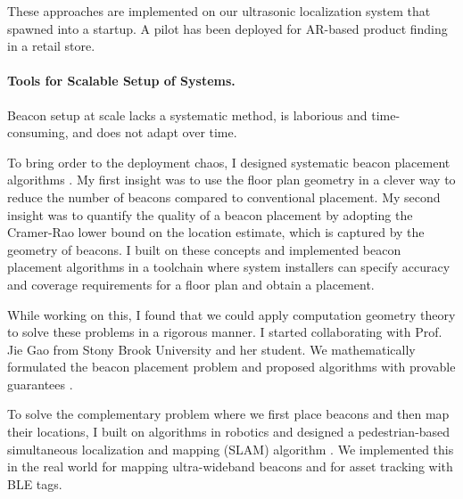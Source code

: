 \documentclass[10pt]{article}
\begin{document}
These approaches are implemented on our ultrasonic localization system that spawned into a startup. A pilot has been deployed for AR-based product finding in a retail store. 

\paragraph{Tools for Scalable Setup of Systems.  }
Beacon setup at scale lacks a systematic method, is laborious and time-consuming, and does not adapt over time. %

To bring order to the deployment chaos, I designed systematic beacon placement algorithms \cite{rajagopal2016beacon}. 
My first insight was to use the floor plan geometry in a clever way to reduce the number of beacons compared to conventional placement. 
My second insight was to quantify the quality of a beacon placement by adopting the Cramer-Rao lower bound on the location estimate, which is captured by the geometry of beacons. I built on these concepts and implemented beacon placement algorithms in a toolchain where system installers can specify accuracy and coverage requirements for a floor plan and obtain a placement. 

While working on this, I found that we could apply computation geometry theory to solve these problems in a rigorous manner.  
I started collaborating with Prof. Jie Gao from Stony Brook University and her student. 
We mathematically formulated the beacon placement problem and proposed algorithms with provable guarantees \cite{beaconplacementtheory}.  

To solve the complementary problem where we first place beacons and then map their locations, I built on algorithms in robotics and designed a pedestrian-based simultaneous localization and mapping (SLAM) algorithm \cite{mobileAR}. We implemented this in the real world for mapping ultra-wideband beacons and for asset tracking with BLE tags. 

\end{document}
